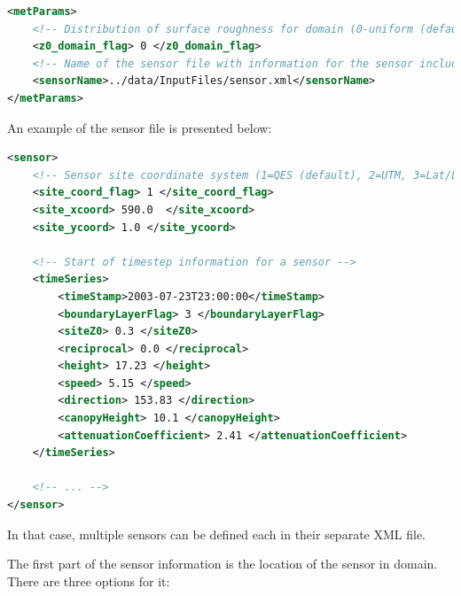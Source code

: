 \begin{enumerate}
\begin{lstlisting}[language=XML]
<metParams>
	<!-- Distribution of surface roughness for domain (0-uniform (default), 1-custom -->
	<z0_domain_flag> 0 </z0_domain_flag>
	<!-- Name of the sensor file with information for the sensor included -->
	<sensorName>../data/InputFiles/sensor.xml</sensorName>
</metParams>
\end{lstlisting}

An example of the sensor file is presented below: 
\begin{lstlisting}[language=XML]
<sensor>
	<!-- Sensor site coordinate system (1=QES (default), 2=UTM, 3=Lat/Lon) --> 
	<site_coord_flag> 1 </site_coord_flag> 		
	<site_xcoord> 590.0  </site_xcoord> 		
	<site_ycoord> 1.0 </site_ycoord> 			

	<!-- Start of timestep information for a sensor -->
	<timeSeries>
		<timeStamp>2003-07-23T23:00:00</timeStamp>		
		<boundaryLayerFlag> 3 </boundaryLayerFlag> 	
		<siteZ0> 0.3 </siteZ0> 
		<reciprocal> 0.0 </reciprocal>
		<height> 17.23 </height> 				
		<speed> 5.15 </speed> 					
		<direction> 153.83 </direction> 			
		<canopyHeight> 10.1 </canopyHeight>
		<attenuationCoefficient> 2.41 </attenuationCoefficient>
	</timeSeries>

	<!-- ... -->
</sensor>
\end{lstlisting}
In that case, multiple sensors can be defined each in their separate XML file.

\end{enumerate}

The first part of the sensor information is the location of the sensor in domain. There are three options for it:

